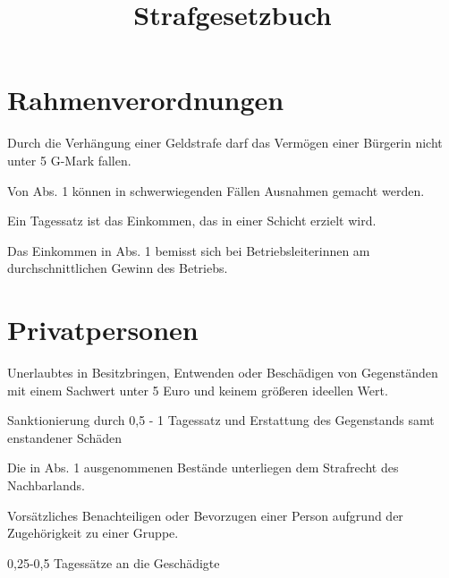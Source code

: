 \documentclass{sasbase}
\begin{document}
\title{Strafgesetzbuch}

\setcounter{secnumdepth}{5}

\mytitle

\parensstyle

\section{Rahmenverordnungen}

\begin{lawparagraph}[Existenzminimum]
	\item Durch die Verhängung einer Geldstrafe darf das Vermögen einer Bürgerin nicht unter
        5 G-Mark fallen.
    \item Von Abs. 1 können in schwerwiegenden Fällen Ausnahmen gemacht werden.
\end{lawparagraph}

\begin{lawparagraph}[Sanktionsbestände]
    \item Ein Tagessatz ist das Einkommen, das in einer Schicht erzielt wird.
    \item Das Einkommen in Abs. 1 bemisst sich bei Betriebsleiterinnen am durchschnittlichen Gewinn
        des Betriebs.
\end{lawparagraph}

\section{Privatpersonen}

\begin{lawparagraph}
	\item Unerlaubtes in Besitzbringen, Entwenden oder Beschädigen von Gegenständen mit einem
        Sachwert unter 5 Euro und keinem größeren ideellen Wert.
    \item Sanktionierung durch 0,5 - 1 Tagessatz und Erstattung des Gegenstands samt enstandener
        Schäden
    \item Die in Abs. 1 ausgenommenen Bestände unterliegen dem Strafrecht des Nachbarlands.
\end{lawparagraph}

\begin{lawparagraph}[Diskriminierung]
    \item Vorsätzliches Benachteiligen oder Bevorzugen einer Person aufgrund der Zugehörigkeit zu einer
        Gruppe.
    \item 0,25-0,5 Tagessätze an die Geschädigte
\end{lawparagraph}
\end{document}

